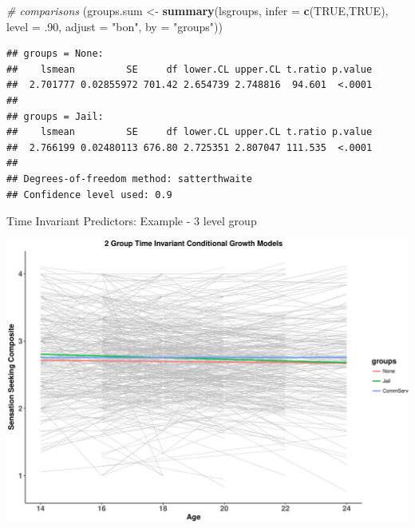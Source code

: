 \documentclass[ignorenonframetext,]{beamer}
\newenvironment{Shaded}{\begin{snugshade}}{\end{snugshade}}
\newcommand{\KeywordTok}[1]{\textcolor[rgb]{0.13,0.29,0.53}{\textbf{{#1}}}}
\newcommand{\DataTypeTok}[1]{\textcolor[rgb]{0.13,0.29,0.53}{{#1}}}
\newcommand{\DecValTok}[1]{\textcolor[rgb]{0.00,0.00,0.81}{{#1}}}
\newcommand{\StringTok}[1]{\textcolor[rgb]{0.31,0.60,0.02}{{#1}}}
\newcommand{\CommentTok}[1]{\textcolor[rgb]{0.56,0.35,0.01}{\textit{{#1}}}}
\newcommand{\OtherTok}[1]{\textcolor[rgb]{0.56,0.35,0.01}{{#1}}}
\newcommand{\NormalTok}[1]{{#1}}
\begin{document}
\begin{frame}[fragile]

\begin{Shaded}
\begin{Highlighting}[]
\CommentTok{# comparisons}
\NormalTok{(groups.sum <-}\StringTok{ }\KeywordTok{summary}\NormalTok{(lsgroups, }\DataTypeTok{infer =} \KeywordTok{c}\NormalTok{(}\OtherTok{TRUE}\NormalTok{,}\OtherTok{TRUE}\NormalTok{), }
          \DataTypeTok{level =} \NormalTok{.}\DecValTok{90}\NormalTok{, }\DataTypeTok{adjust =} \StringTok{"bon"}\NormalTok{, }\DataTypeTok{by =} \StringTok{"groups"}\NormalTok{))}
\end{Highlighting}
\end{Shaded}

\begin{verbatim}
## groups = None:
##    lsmean         SE     df lower.CL upper.CL t.ratio p.value
##  2.701777 0.02855972 701.42 2.654739 2.748816  94.601  <.0001
## 
## groups = Jail:
##    lsmean         SE     df lower.CL upper.CL t.ratio p.value
##  2.766199 0.02480113 676.80 2.725351 2.807047 111.535  <.0001
## 
## Degrees-of-freedom method: satterthwaite 
## Confidence level used: 0.9
\end{verbatim}

\end{frame}

\begin{frame}{Time Invariant Predictors: Example - 3 level group}

\includegraphics{Conditional_Models_files/figure-beamer/unnamed-chunk-40-1.pdf}

\end{frame}
\end{document}
